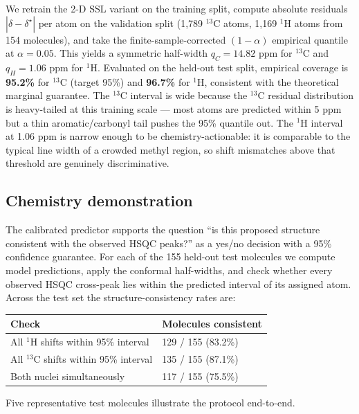 \documentclass[11pt,a4paper]{article}
\begin{document}
We retrain the 2-D SSL variant on the training split, compute absolute residuals \(|\hat{\delta} - \delta^\star|\) per atom on the validation split (1,789 \(^{13}\)C atoms, 1,169 \(^{1}\)H atoms from 154 molecules), and take the finite-sample-corrected \((1-\alpha)\) empirical quantile at \(\alpha = 0.05\). This yields a symmetric half-width \(q_C = 14.82\) ppm for \(^{13}\)C and \(q_H = 1.06\) ppm for \(^{1}\)H. Evaluated on the held-out test split, empirical coverage is \textbf{95.2\%} for \(^{13}\)C (target 95\%) and \textbf{96.7\%} for \(^{1}\)H, consistent with the theoretical marginal guarantee. The \(^{13}\)C interval is wide because the \(^{13}\)C residual distribution is heavy-tailed at this training scale --- most atoms are predicted within 5 ppm but a thin aromatic/carbonyl tail pushes the 95\% quantile out. The \(^{1}\)H interval at 1.06 ppm is narrow enough to be chemistry-actionable: it is comparable to the typical line width of a crowded methyl region, so shift mismatches above that threshold are genuinely discriminative.

\subsection{Chemistry demonstration}\label{chemistry-demonstration}

The calibrated predictor supports the question ``is this proposed structure consistent with the observed HSQC peaks?'' as a yes/no decision with a 95\% confidence guarantee. For each of the 155 held-out test molecules we compute model predictions, apply the conformal half-widths, and check whether every observed HSQC cross-peak lies within the predicted interval of its assigned atom. Across the test set the structure-consistency rates are:

{\def\LTcaptype{none} %
\begin{longtable}[]{@{}ll@{}}
\toprule\noalign{}
Check & Molecules consistent \\
\midrule\noalign{}
\endhead
\bottomrule\noalign{}
\endlastfoot
All \(^{1}\)H shifts within 95\% interval & 129 / 155 (83.2\%) \\
All \(^{13}\)C shifts within 95\% interval & 135 / 155 (87.1\%) \\
Both nuclei simultaneously & 117 / 155 (75.5\%) \\
\end{longtable}
}

Five representative test molecules illustrate the protocol end-to-end.
\end{document}
